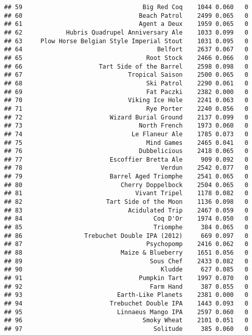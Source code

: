 \documentclass[
]{article}
\begin{document}
\begin{verbatim}
## 59                                 Big Red Coq    1044 0.060   0
## 60                                Beach Patrol    2499 0.065   0
## 61                                Agent a Deux    1959 0.065   0
## 62            Hubris Quadrupel Anniversary Ale    1033 0.099   0
## 63     Plow Horse Belgian Style Imperial Stout    1031 0.095   0
## 64                                     Belfort    2637 0.067   0
## 65                                  Root Stock    2466 0.066   0
## 66                     Tart Side of the Barrel    2598 0.098   0
## 67                             Tropical Saison    2500 0.065   0
## 68                                  Ski Patrol    2290 0.061   0
## 69                                  Fat Paczki    2382 0.000   0
## 70                             Viking Ice Hole    2241 0.063   0
## 71                                  Rye Porter    2240 0.056   0
## 72                        Wizard Burial Ground    2137 0.099   0
## 73                                North French    1973 0.060   0
## 74                              Le Flaneur Ale    1785 0.073   0
## 75                                  Mind Games    2465 0.041   0
## 76                                Dubbelicious    2418 0.065   0
## 77                        Escoffier Bretta Ale     909 0.092   0
## 78                                      Verdun    2542 0.077   0
## 79                        Barrel Aged Triomphe    2541 0.065   0
## 80                           Cherry Doppelbock    2504 0.065   0
## 81                               Vivant Tripel    1178 0.082   0
## 82                       Tart Side of the Moon    1136 0.098   0
## 83                             Acidulated Trip    2467 0.059   0
## 84                                    Coq D'Or    1974 0.050   0
## 85                                    Triomphe     384 0.065   0
## 86                 Trebuchet Double IPA (2012)     669 0.097   0
## 87                                  Psychopomp    2416 0.062   0
## 88                           Maize & Blueberry    1651 0.056   0
## 89                                   Sous Chef    2433 0.082   0
## 90                                      Kludde     627 0.085   0
## 91                                Pumpkin Tart    1997 0.070   0
## 92                                   Farm Hand     387 0.055   0
## 93                          Earth-Like Planets    2381 0.000   0
## 94                        Trebuchet Double IPA    1443 0.093   0
## 95                          Linnaeus Mango IPA    2597 0.060   0
## 96                                 Smoky Wheat    2101 0.051   0
## 97                                    Solitude     385 0.060   0

\end{verbatim}
\end{document}
